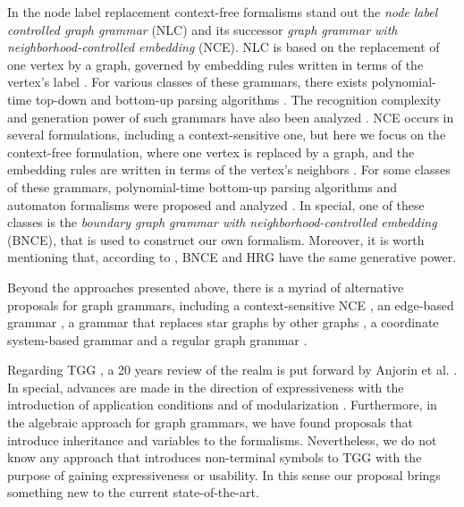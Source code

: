 In the node label replacement context-free formalisms stand out the  \textit{node label controlled graph grammar} (NLC) and its successor \textit{graph grammar with neighborhood-controlled embedding} (NCE). NLC is based on the replacement of one vertex by a graph, governed by embedding rules written in terms of the vertex's label \cite{rozenberg1986boundary}. For various classes of these grammars, there exists polynomial-time top-down and bottom-up parsing algorithms \cite{flasinski1993parsing,flasinski2014characteristics, rozenberg1986boundary, wanke1991algorithms}. The recognition complexity and generation power of such grammars have also been analyzed \cite{flasinski1998power,kim2012structure}. NCE occurs in several formulations, including a context-sensitive one, but here we focus on the context-free formulation, where one vertex is replaced by a graph, and the embedding rules are written in terms of the vertex's neighbors \cite{janssens1982graph,skodinis1998neighborhood}. For some classes of these grammars, polynomial-time bottom-up parsing algorithms and automaton formalisms were proposed and analyzed \cite{kim2001efficient,brandenburg2005finite}. In special, one of these classes is the \textit{boundary graph grammar with neighborhood-controlled embedding} (BNCE), that is used to construct our own formalism. Moreover, it is worth mentioning that, according to \cite{engelfiet1990comparison}, BNCE and HRG have the same generative power.


Beyond the approaches presented above, there is a myriad of alternative proposals for graph grammars, including a context-sensitive NCE \cite{adachi1999nce}, an edge-based grammar \cite{shi2015method}, a grammar that replaces star graphs by other graphs \cite{drewes2010adaptive}, a coordinate system-based grammar \cite{kong2006spatial} and a regular graph grammar \cite{gilroy2017parsing}.

Regarding TGG \cite{schurr1994specification}, a 20 years review of the realm is put forward by Anjorin et al. \cite{anjorin201620}. In special, advances are made in the direction of expressiveness with the introduction of application conditions \cite{klar2010extended} and of modularization \cite{anjorin2014modularizing}. Furthermore, in the algebraic approach for graph grammars, we have found proposals that introduce inheritance \cite{bardohl2004integrating,hermann2008typed} and variables \cite{hoffmann2005graph} to the formalisms. Nevertheless, we do not know any approach that introduces non-terminal symbols to TGG with the purpose of gaining expressiveness or usability. In this sense our proposal brings something new to the current state-of-the-art.

